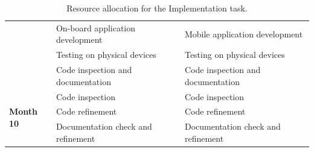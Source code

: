 \begin{table}[H]
\begin{adjustwidth}{-.5in}{-.5in}
\begin{tabular}{ p{} | p{} | p{} }
        & On-board application development & Mobile application development \\ \cline{2-3}
        & Testing on physical devices & Testing on physical devices \\ \cline{2-3}
        & Code inspection and documentation & Code inspection and documentation \\
        \hline
        \hline
        \multirow{3}{*}{\textbf{Month 10}} & Code inspection & Code inspection \\ \cline{2-3}
        & Code refinement & Code refinement \\ \cline{2-3}
        & Documentation check and refinement & Documentation check and refinement \\
        \hline
    \end{tabular}
    \caption{Resource allocation for the Implementation task.}
    \label{rasd_allocation}
    \end{adjustwidth}
\end{table}